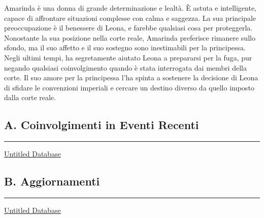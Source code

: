 Amarinda è una donna di grande determinazione e lealtà. È astuta e
intelligente, capace di affrontare situazioni complesse con calma e
saggezza. La sua principale preoccupazione è il benessere di Leona, e
farebbe qualsiasi cosa per proteggerla. Nonostante la sua posizione
nella corte reale, Amarinda preferisce rimanere sullo sfondo, ma il suo
affetto e il suo sostegno sono inestimabili per la principessa. Negli
ultimi tempi, ha segretamente aiutato Leona a prepararsi per la fuga,
pur negando qualsiasi coinvolgimento quando è stata interrogata dai
membri della corte. Il suo amore per la principessa l'ha spinta a
sostenere la decisione di Leona di sfidare le convenzioni imperiali e
cercare un destino diverso da quello imposto dalla corte reale.

\subsection{A. Coinvolgimenti in Eventi
Recenti}\label{a.-coinvolgimenti-in-eventi-recenti}

\begin{center}\rule{0.5\linewidth}{0.5pt}\end{center}

\href{Untitled\%20Database\%20ebdcd210a5d74a8e8603c3356a0daf65.csv}{Untitled
Database}

\subsection{B. Aggiornamenti}\label{b.-aggiornamenti}

\begin{center}\rule{0.5\linewidth}{0.5pt}\end{center}

\href{Untitled\%20Database\%20c4aa259cbb3945d5a85eef6558b6cd30.csv}{Untitled
Database}
